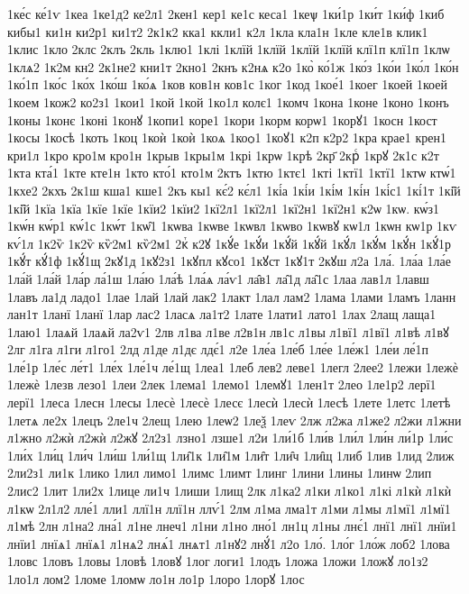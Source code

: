 {1ке́с
ке́1ѵ
1кеа
1ке1д2
ке2л1
2кен1
кер1
ке1с
кеса1
1кеѱ
1ки́1р
1ки́т
1ки́ф
1киб
кибы1
ки1н
ки2р1
ки1т2
2к1к2
кка1
ккли1
к2л
1кла
кла1н
1кле
кле1в
клик1
1клис
1кло
2клс
2клъ
2кль
1клю1
1клі
1клїй
1клїй
1клїй
1клїй
клї1п
клї1п
1клѡ
1клѧ2
1к2м
кн2
2к1не2
кни1т
2кно1
2кнъ
к2нѧ
к2о
1ко̀
ко́1ж
1ко́з
1ко́и
1ко́л
1ко́н
1ко́1п
1ко́с
1ко́х
1ко́ш
1ко́ѧ
1ков
ков1н
ков1с
1ког
1код
1кое́1
1коег
1коей
1коей
1коем
1кож2
ко2з1
1кои1
1кой
1кой
1ко1л
колє1
1комч
1кона
1коне
1коно
1конъ
1коны
1конє
1коні
1конꙋ
1копи1
коре1
1кори
1корм
корѡ1
1корꙋ1
1косн
1кост
1косы
1косѣ
1коть
1коц
1коѝ
1коѝ
1коѧ
1коѻ1
1коꙋ1
к2п
к2р2
1кра
крае1
крен1
кри1л
1кро
кро1м
кро1н
1крыв
1кры1м
1крі
1крѡ
1крѣ
2кр҃
2крⷭ
1крꙋ
2к1с
к2т
1кта
кта́1
1кте
кте1н
1кто
кто́1
кто1м
2ктъ
1ктю
1ктє1
1кті
1ктї1
1ктї1
1ктѡ
ктѡ́1
1кхе2
2кхъ
2к1ш
кша1
кше1
2къ
кы1
кє́2
кє́л1
1кі́а
1кі́и
1кі́м
1кі́н
1кі́с1
1кі́1т
1кі̑й
1кі̑й
1кїа
1кїа
1кїе
1кїе
1кїи2
1кїи2
1кї2л1
1кї2л1
1кї2н1
1кї2н1
к2ѡ
1кѡ.
кѡ́з1
1кѡ́н
кѡ́р1
кѡ́1с
1кѡ́т
1кѡ̑1
1кѡва
1кѡве
1кѡвл
1кѡво
1кѡвꙋ
кѡ1л
1кѡн
кѡ1р
1кѵ
кѵ́1л
1к2ѷ
1к2ѷ
кѷ2м1
кѷ2м1
2кⷮ
к2ꙋ
1кꙋ́е
1кꙋ́и
1кꙋ́й
1кꙋ́й
1кꙋ́л
1кꙋ́м
1кꙋ́н
1кꙋ́1р
1кꙋ́т
кꙋ́1ф
1кꙋ́1щ
2кꙋ1д
1кꙋ2з1
1кꙋпл
кꙋсо1
1кꙋст
1кꙋ1т
2кꙋш
л2а
1ла́.
1ла́а
1ла́е
1ла́й
1ла́й
1ла́р
ла́1ш
1ла́ю
1ла́ѣ
1ла́ѧ
ла́ѵ1
ла̑в1
ла̑1д
ла̑1с
1лаа
лав1л
1лавш
1лавъ
ла1д
ладо1
1лае
1лай
1лай
лак2
1лакт
1лал
лам2
1лама
1лами
1ламъ
1ланн
лан1т
1ланї
1ланї
1лар
лас2
1ласѧ
ла1т2
1лате
1лати1
лато1
1лах
2лащ
лаща1
1лаю1
1лаѧй
1лаѧй
ла2ѵ1
2лв
л1ва
л1ве
л2в1н
лв1с
л1вы
л1вї1
л1вї1
л1вѣ
л1вꙋ
2лг
л1га
л1ги
л1го1
2лд
л1де
л1дє
лдє́1
л2е
1ле́а
1ле́б
1ле́е
1ле́ж1
1ле́и
ле́1п
1ле́1р
1ле́с
ле́т1
1ле́х
1ле́1ч
ле́1щ
1леа1
1леб
лев2
леве1
1легл
2лее2
1лежи
1лежѐ
1лежѐ
1лезв
лезо1
1леи
2лек
1лема1
1лемо1
1лемꙋ1
1лен1т
2лео
1ле1р2
лерї1
лерї1
1леса
1лесн
1лесы
1лесѐ
1лесѐ
1лесє
1лесѝ
1лесѝ
1лесѣ
1лете
1летс
1летѣ
1летѧ
ле2х
1лецъ
2ле1ч
2лещ
1лею
1леѡ2
1леѯ
1леѵ
2лж
л2жа
л1же2
л2жи
л1жни
л1жно
л2жѝ
л2жѝ
л2жꙋ
2л2з1
лзно1
лзше1
л2и
1ли́1б
1ли́в
1ли́л
1ли́н
ли́1р
1ли́с
1ли́х
1ли́ц
1ли́ч
1ли́ш
1ли́1щ
1ли̑1к
1ли̑1м
1ли̑т
1ли̑ч
1ли̑щ
1либ
1лив
1лид
2лиж
2ли2з1
ли1к
1лико
1лил
лимо1
1лимс
1лимт
1линг
1лини
1лины
1линѡ
2лип
2лис2
1лит
1ли2х
1лице
ли1ч
1лиши
1лищ
2лк
л1ка2
л1ки
л1ко1
л1кі
л1кѝ
л1кѝ
л1кѡ
2л1л2
лле́1
лли1
ллї1н
ллї1н
ллѵ́1
2лм
л1ма
лма1т
л1ми
л1мы
л1мї1
л1мї1
л1мѣ
2лн
л1на2
лна́1
л1не
лнеч1
л1ни
л1но
лно́1
лн1ц
л1ны
лнє́1
лнї1
лнї1
лнїи1
лнїи1
лнїѧ1
лнїѧ1
л1нѧ2
лнѧ́1
лнѧт1
л1нꙋ2
лнꙋ́1
л2о
1ло́.
1ло́г
1ло́ж
лоб2
1лова
1ловс
1ловъ
1ловы
1ловѣ
1ловꙋ
1лог
логи1
1лодъ
1ложа
1ложи
1ложꙋ
ло1з2
1ло1л
лом2
1ломе
1ломѡ
ло1н
ло1р
1лоро
1лорꙋ
1лос
}
